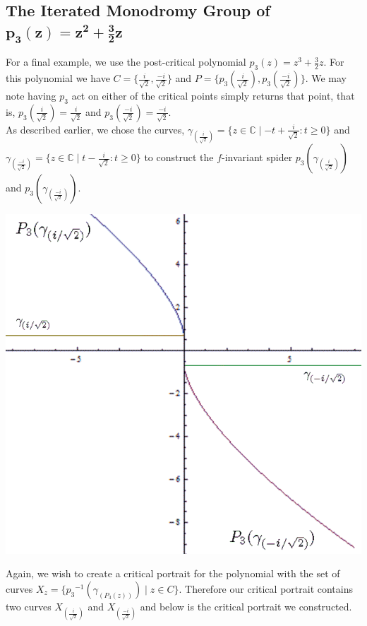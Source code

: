\documentclass[11pt]{amsart}
\theoremstyle{definition}
\theoremstyle{remark}
\numberwithin{equation}{section}
\begin{document}
\subsection{The Iterated Monodromy Group of $\mathbf{p_3(z)=z^2+\frac{3}{2}z}$} \text{\space}

\indent For a final example, we use the post-critical polynomial $p_3(z)= z^3 + \frac{3}{2}z$. For this polynomial we have $C = \{ \frac{i}{\sqrt{2}},\frac{-i}{\sqrt{2}}\}$ and  $P = \{ p_3 (\frac{i}{\sqrt{2}}),p_3 (\frac{-i}{\sqrt{2}})\}$.  We may note having $p_3$ act on either of the critical points simply returns that point, that is, $p_3(\frac{i}{\sqrt{2}}) = \frac{i}{\sqrt{2}}$ and $ p_3(\frac{-i}{\sqrt{2}}) = \frac{-i}{\sqrt{2}}$.\\
\indent As described earlier, we chose the curves, $\gamma_{(\frac{i}{\sqrt{2}})} = \{z \in \mathbb{C} \mid -t + \frac{i}{\sqrt{2}} : t \geq 0\}$ and $\gamma_{(\frac{-i}{\sqrt{2}})} = \{z \in \mathbb{C} \mid t - \frac{i}{\sqrt{2}} : t \geq 0\}$ to construct the $f$-invariant spider $p_3(\gamma_{(\frac{i}{\sqrt{2}})})$ and $p_3(\gamma_{(\frac{-i}{\sqrt{2}})})$.\\

\begin{center}
\includegraphics[scale=0.25]{1_5_spider_2.png}
\end{center}

\indent Again, we wish to create a critical portrait for the polynomial with the set of curves $X_z = \{{p_3}^{-1}(\gamma_{(P_3(z))}) \mid z \in C\}$.  Therefore our critical portrait contains two curves $X_{(\frac{i}{\sqrt{2}})}$ and $X_{(\frac{-i}{\sqrt{2}})}$ and below is the critical portrait we constructed.\\
\end{document}
